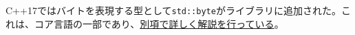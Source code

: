 %

C++17ではバイトを表現する型として\lstinline!std::byte!がライブラリに追加された。これは、コア言語の一部であり、\hyperref[std.byte]{別項で詳しく解説を行っている}。

